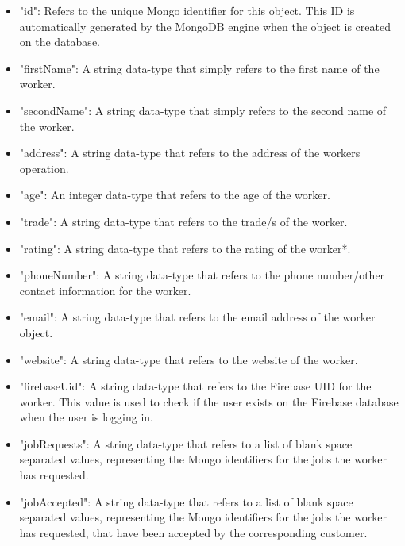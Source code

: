 \begin{itemize}

\item "id": Refers to the unique Mongo identifier for this object. This ID is automatically generated by the MongoDB engine when the object is created on the database.

\item "firstName": A string data-type that simply refers to the first name of the worker.

\item "secondName": A string data-type that simply refers to the second name of the worker.

\item "address": A string data-type that refers to the address of the workers operation.

\item "age": An integer data-type that refers to the age of the worker.

\item  "trade":  A string data-type that refers to the trade/s of the worker.

\item "rating": A string data-type that refers to the rating of the worker*. 

\item "phoneNumber": A string data-type that refers to the phone number/other contact information for the worker.

\item "email": A string data-type that refers to the email address of the worker object.

\item "website": A string data-type that refers to the website of the worker. 

\item "firebaseUid": A string data-type that refers to the Firebase UID for the worker. This value is used to check if the user exists on the Firebase database when the user is logging in.

\item "jobRequests": A string data-type that refers to a list of blank space separated values, representing the Mongo identifiers for the jobs the worker has requested.

\item "jobAccepted": A string data-type that refers to a list of blank space separated values, representing the Mongo identifiers for the jobs the worker has requested, that have been accepted by the corresponding customer.
\end{itemize}

